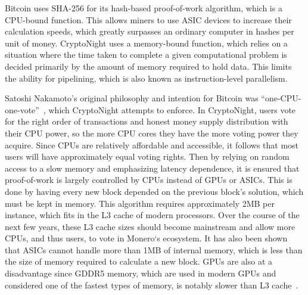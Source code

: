 Bitcoin uses SHA-256 for its hash-based proof-of-work algorithm, which is a CPU-bound function. This allows miners to use ASIC devices to increase their calculation speeds, which greatly surpasses an ordinary computer in hashes per unit of money. CryptoNight uses a memory-bound function, which relies on a situation where the time taken to complete a given computational problem is decided primarily by the amount of memory required to hold data. This limits the ability for pipelining, which is also known as instruction-level parallelism.  


Satoshi Nakamoto’s original philosophy and intention for Bitcoin was “one-CPU-one-vote”~\cite{nakamoto2008bitcoin}, which CryptoNight attempts to enforce. In CryptoNight, users vote for the right order of transactions and honest money supply distribution with their CPU power, so the more CPU cores they have the more voting power they acquire. Since CPUs are relatively affordable and accessible, it follows that most users will have approximately equal voting rights. Then by relying on random access to a slow memory and emphasizing latency dependence, it is ensured that proof-of-work is largely controlled by CPUs instead of GPUs or ASICs. This is done by having every new block depended on the previous block’s solution, which must be kept in memory. This algorithm requires approximately 2MB per instance, which fits in the L3 cache of modern processors. Over the course of the next few years, these L3 cache sizes should become mainstream and allow more CPUs, and thus users, to vote in Monero`s ecosystem. It has also been shown that ASICs cannot handle more than 1MB of internal memory, which is less than the size of memory required to calculate a new block. GPUs are also at a disadvantage since GDDR5 memory, which are used in modern GPUs and considered one of the fastest types of memory, is notably slower than L3 cache~\cite{van2013cryptonote}.  

